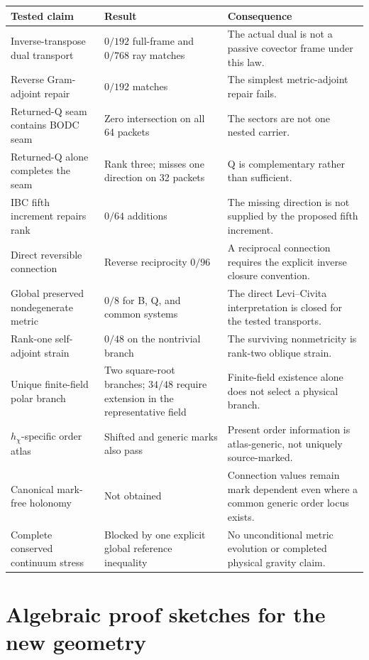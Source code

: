 \documentclass[12pt,a4paper,twoside]{article}
\begin{document}
\begin{longtable}{>{\raggedright\arraybackslash}p{}>{\raggedright\arraybackslash}p{}>{\raggedright\arraybackslash}p{}}
\toprule
Tested claim & Result & Consequence \\
\midrule
\endhead
Inverse-transpose dual transport & $0/192$ full-frame and $0/768$ ray matches & The actual dual is not a passive covector frame under this law. \\
Reverse Gram-adjoint repair & $0/192$ matches & The simplest metric-adjoint repair fails. \\
Returned-Q seam contains BODC seam & Zero intersection on all 64 packets & The sectors are not one nested carrier. \\
Returned-Q alone completes the seam & Rank three; misses one direction on 32 packets & Q is complementary rather than sufficient. \\
IBC fifth increment repairs rank & $0/64$ additions & The missing direction is not supplied by the proposed fifth increment. \\
Direct reversible connection & Reverse reciprocity $0/96$ & A reciprocal connection requires the explicit inverse closure convention. \\
Global preserved nondegenerate metric & $0/8$ for B, Q, and common systems & The direct Levi--Civita interpretation is closed for the tested transports. \\
Rank-one self-adjoint strain & $0/48$ on the nontrivial branch & The surviving nonmetricity is rank-two oblique strain. \\
Unique finite-field polar branch & Two square-root branches; $34/48$ require extension in the representative field & Finite-field existence alone does not select a physical branch. \\
$h_\chi$-specific order atlas & Shifted and generic marks also pass & Present order information is atlas-generic, not uniquely source-marked. \\
Canonical mark-free holonomy & Not obtained & Connection values remain mark dependent even where a common generic order locus exists. \\
Complete conserved continuum stress & Blocked by one explicit global reference inequality & No unconditional metric evolution or completed physical gravity claim. \\
\bottomrule
\end{longtable}

\section{Algebraic proof sketches for the new geometry}
\end{document}
